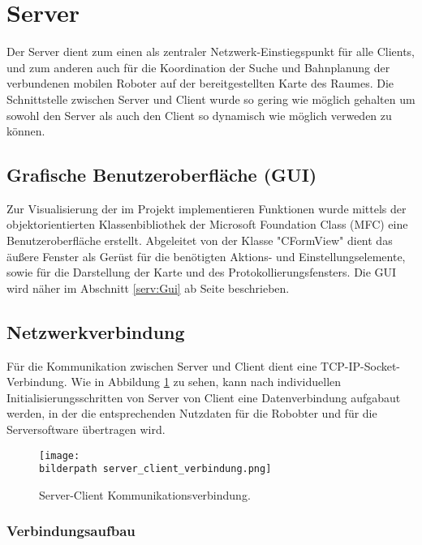 \def\bilderpath{bilder/}

\section{Server}\label{serv:Server}

Der Server dient zum einen als zentraler Netzwerk-Einstiegspunkt für alle Clients, und zum anderen auch für die Koordination der Suche und Bahnplanung der verbundenen mobilen Roboter auf der bereitgestellten Karte des Raumes. Die Schnittstelle zwischen Server und Client wurde so gering wie möglich gehalten um sowohl den Server als auch den Client so dynamisch wie möglich verweden zu können.

\subsection{Grafische Benutzeroberfläche (GUI)}\label{serv:archGui}
Zur Visualisierung der im Projekt implementieren Funktionen wurde
mittels der objektorientierten Klassenbibliothek der Microsoft
Foundation Class (MFC) eine Benutzeroberfläche erstellt. Abgeleitet
von der Klasse "CFormView" dient das äußere Fenster als Gerüst für die
benötigten Aktions- und Einstellungselemente, sowie für die
Darstellung der Karte und des Protokollierungsfensters.  Die GUI wird
näher im Abschnitt \ref{serv:Gui} ab Seite \pageref{serv:Gui} beschrieben.
\subsection{Netzwerkverbindung}\label{serv:netzwerkverbindung}
Für die Kommunikation zwischen Server und Client dient eine TCP-IP-Socket-Verbindung. Wie in Abbildung \ref{serv:fig:netzwerkverbindung} zu sehen, kann nach individuellen Initialisierungsschritten von Server von Client eine Datenverbindung aufgabaut werden, in der die entsprechenden Nutzdaten für die Robobter und für die Serversoftware übertragen wird.

\begin{figure}[h]
	\centering	
	\texttt{[image: \\bilderpath server\_client\_verbindung.png]}
	\caption{Server-Client Kommunikationsverbindung.}
	\label{serv:fig:netzwerkverbindung}
\end{figure}

\subsubsection{Verbindungsaufbau}

